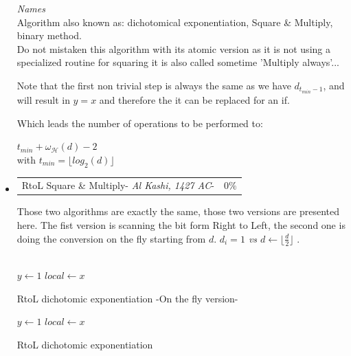 \begin{itemize}
			\textit{Names}\\
			Algorithm also known as: 
			dichotomical exponentiation, Square \& Multiply, binary method. \\
			Do not mistaken this algorithm with its atomic version  as it is not 
			using a specialized routine for squaring it is also called sometime 
			'Multiply always'...		
							
			Note that the first non trivial step is always the same as we have 
			$d_{t_{min}-1} $, and will result in $y=x$ and therefore the it can be replaced for 
			an if.

			Which leads the number of operations to be performed to:
			\begin{center}
				$t_{min} + \omega_{\mathcal{H}}(d)-2$\\
				with $t_{min} =  \lfloor log_2(d) \rfloor$
			\end{center} 
			\newpage

\item  	\begin{tabularx}{\linewidth}{ p{16cm} p{1.5cm}} 
		RtoL Square \& Multiply-
		\textit{Al Kashi, 1427 AC}-  & $0\%$ \\
		\end{tabularx}	
			\noindent	

		Those two algorithms are exactly the same, those two versions are presented here.
		The fist version is scanning the bit form Right to Left, the second one is doing the 
		conversion on the fly starting from $d$.
		\textit{ $d_i= 1$ vs $d  \leftarrow \lfloor \frac{d}{2} \rfloor $ }.\\\\
		\begin{algorithm}[h]
			$y \leftarrow 1$ \;		
			$local \leftarrow x$ \;	
			\;
			\caption{RtoL dichotomic exponentiation -On the fly version-}
		\end{algorithm}		
		\begin{algorithm}[h]
			$y \leftarrow 1$ \;		
			$local \leftarrow x$ \;	
			\;
			\caption{RtoL dichotomic exponentiation}
		\end{algorithm}				


\end{itemize}
